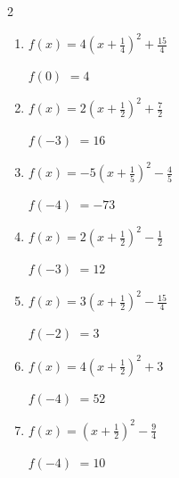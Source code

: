 \begin{multicols}{2}
\begin{enumerate}
$f(-5)$
        $=-139$

  \item $\displaystyle f(x)=4\left( x+\frac{1}{4}\right)^{2}+\frac{15}{4}$

$f(0)$
        $=4$

  \item $\displaystyle f(x)=2\left( x+\frac{1}{2}\right)^{2}+\frac{7}{2}$

$f(-3)$
        $=16$

\columnbreak %

  \item $\displaystyle f(x)=-5\left( x+\frac{1}{5}\right)^{2}-\frac{4}{5}$

$f(-4)$
        $=-73$

  \item $\displaystyle f(x)=2\left( x+\frac{1}{2}\right)^{2}-\frac{1}{2}$

$f(-3)$
        $=12$

  \item $\displaystyle f(x)=3\left( x+\frac{1}{2}\right)^{2}-\frac{15}{4}$

$f(-2)$
        $=3$

  \item $\displaystyle f(x)=4\left( x+\frac{1}{2}\right)^{2}+3$

$f(-4)$
        $=52$

  \item $\displaystyle f(x)=\left( x+\frac{1}{2}\right)^{2}-\frac{9}{4}$

$f(-4)$
        $=10$

\end{enumerate}
\end{multicols}
